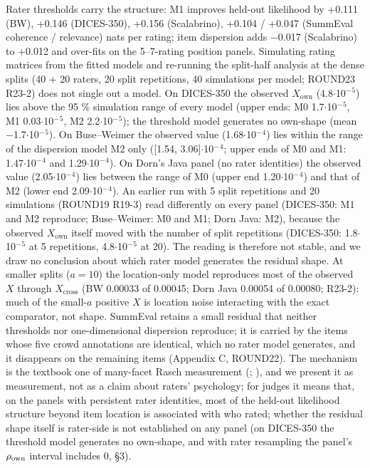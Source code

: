 \documentclass{article}
\begin{document}
Rater thresholds carry the structure: M1 improves held-out likelihood by +0.111 (BW), +0.146 (DICES-350), +0.156 (Scalabrino), +0.104 / +0.047 (SummEval coherence / relevance) nats per rating; item dispersion adds $-$0.017 (Scalabrino) to +0.012 and over-fits on the 5--7-rating position panels. Simulating rating matrices from the fitted models and re-running the split-half analysis at the dense splits (40 + 20 raters, 20 split repetitions, 40 simulations per model; ROUND23 R23-2) does not single out a model. On DICES-350 the observed \(X_{\text{own}}\) (4.8$\cdot$10$^{-}$$^{5}$) lies above the 95 \% simulation range of every model (upper ends: M0 1.7$\cdot$10$^{-}$$^{5}$, M1 0.03$\cdot$10$^{-}$$^{5}$, M2 2.2$\cdot$10$^{-}$$^{5}$); the threshold model generates no own-shape (mean $-$1.7$\cdot$10$^{-}$$^{5}$). On Buse--Weimer the observed value (1.68$\cdot$10$^{-}$$^{4}$) lies within the range of the dispersion model M2 only ({[}1.54, 3.06{]}$\cdot$10$^{-}$$^{4}$; upper ends of M0 and M1: 1.47$\cdot$10$^{-}$$^{4}$ and 1.29$\cdot$10$^{-}$$^{4}$). On Dorn's Java panel (no rater identities) the observed value (2.05$\cdot$10$^{-}$$^{4}$) lies between the range of M0 (upper end 1.20$\cdot$10$^{-}$$^{4}$) and that of M2 (lower end 2.09$\cdot$10$^{-}$$^{4}$). An earlier run with 5 split repetitions and 20 simulations (ROUND19 R19-3) read differently on every panel (DICES-350: M1 and M2 reproduce; Buse--Weimer: M0 and M1; Dorn Java: M2), because the observed \(X_{\text{own}}\) itself moved with the number of split repetitions (DICES-350: 1.8$\cdot$10$^{-}$$^{5}$ at 5 repetitions, 4.8$\cdot$10$^{-}$$^{5}$ at 20). The reading is therefore not stable, and we draw no conclusion about which rater model generates the residual shape. At smaller splits (\(a=10\)) the location-only model reproduces most of the observed \(X\) through \(X_{\text{cross}}\) (BW 0.00033 of 0.00045; Dorn Java 0.00054 of 0.00080; R23-2): much of the small-\(a\) positive \(X\) is location noise interacting with the exact comparator, not shape. SummEval retains a small residual that neither thresholds nor one-dimensional dispersion reproduce; it is carried by the items whose five crowd annotations are identical, which no rater model generates, and it disappears on the remaining items (Appendix C, ROUND22). The mechanism is the textbook one of many-facet Rasch measurement (\citealp{linacre1989mfrm}; \citealp{eckes2011mfrm}), and we present it as measurement, not as a claim about raters' psychology; for judges it means that, on the panels with persistent rater identities, most of the held-out likelihood structure beyond item location is associated with who rated; whether the residual shape itself is rater-side is not established on any panel (on DICES-350 the threshold model generates no own-shape, and with rater resampling the panel's \(\rho_{\rm own}\) interval includes 0, \S{}3).
\end{document}
